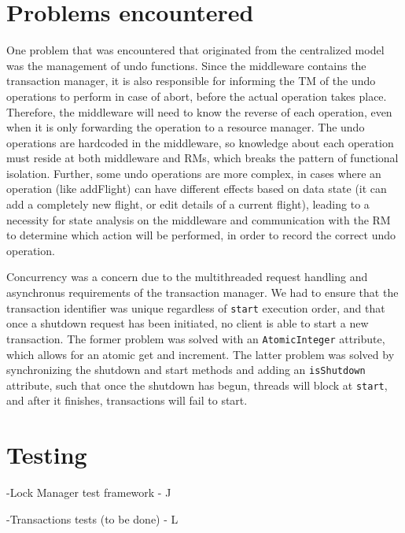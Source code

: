\documentclass[11pt]{article}
\begin{document}
\section*{Problems encountered}

One problem that was encountered that originated from the centralized model was the management of undo functions. Since the middleware contains the transaction manager, it is also responsible for informing the TM of the undo operations to perform in case of abort, before the actual operation takes place. Therefore, the middleware will need to know the reverse of each operation, even when it is only forwarding the operation to a resource manager. The undo operations are hardcoded in the middleware, so knowledge about each operation must reside at both middleware and RMs, which breaks the pattern of functional isolation. Further, some undo operations are more complex, in cases where an operation (like addFlight) can have different effects based on data state (it can add a completely new flight, or edit details of a current flight), leading to a necessity for state analysis on the middleware and communication with the RM to determine which action will be performed, in order to record the correct undo operation.

Concurrency was a concern due to the multithreaded request handling and asynchronus requirements of the transaction manager. We had to ensure that the transaction identifier was unique regardless of \texttt{start} execution order, and that once a shutdown request has been initiated, no client is able to start a new transaction. The former problem was solved with an \texttt{AtomicInteger} attribute, which allows for an atomic get and increment. The latter problem was solved by synchronizing the shutdown and start methods and adding an \texttt{isShutdown} attribute, such that once the shutdown has begun, threads will block at \texttt{start}, and after it finishes, transactions will fail to start.

\section*{Testing}

-Lock Manager test framework - J

-Transactions tests (to be done) - L
\end{document}
